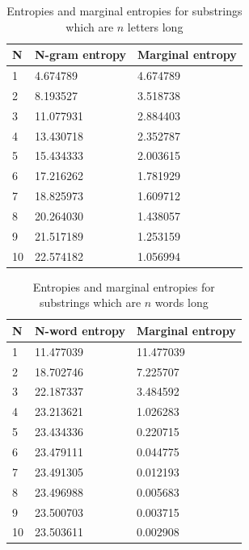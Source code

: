 \begin{table}[h]
\centering
\begin{tabular}{ |p{1cm}||p{3cm}|p{3cm}|  }
 \hline
    N  & N-gram entropy & Marginal entropy\\
 \hline
    1  &     4.674789   &      4.674789\\
    2  &     8.193527   &      3.518738\\
    3  &    11.077931   &      2.884403\\
    4  &    13.430718   &      2.352787\\
    5  &    15.434333   &      2.003615\\
    6  &    17.216262   &      1.781929\\
    7  &    18.825973   &      1.609712\\
    8  &    20.264030   &      1.438057\\
    9  &    21.517189   &      1.253159\\
    10 &    22.574182   &      1.056994\\
 \hline
\end{tabular}
\caption{Entropies and marginal entropies for substrings which are $n$ letters long
\label{tab:n_gram_entropy}}
\end{table}



\begin{table}[h]
\centering
\begin{tabular}{ |p{1cm}||p{3cm}|p{3cm}|  }
 \hline
    N  & N-word entropy & Marginal entropy\\
 \hline
    1  &    11.477039   &     11.477039\\
    2  &    18.702746   &      7.225707\\
    3  &    22.187337   &      3.484592\\
    4  &    23.213621   &      1.026283\\
    5  &    23.434336   &      0.220715\\
    6  &    23.479111   &      0.044775\\
    7  &    23.491305   &      0.012193\\
    8  &    23.496988   &      0.005683\\
    9  &    23.500703   &      0.003715\\
    10 &    23.503611   &      0.002908\\
 \hline
\end{tabular}
\caption{Entropies and marginal entropies for substrings which are $n$ words long
\label{tab:n_word_entropy}}
\end{table}


